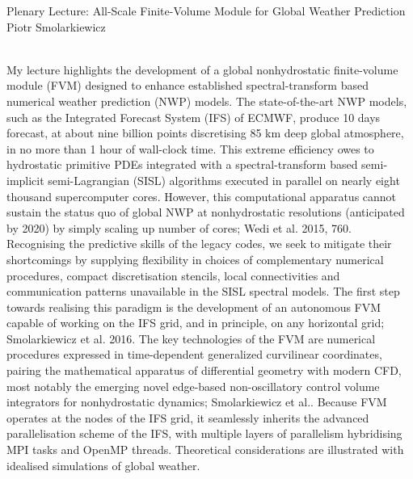     {  
			{Plenary Lecture: All-Scale Finite-Volume Module for Global Weather Prediction} \\
    \normalfont\small Piotr Smolarkiewicz }
    
    {  \\    
    } 
      {  } 
	\vspace{1cm} 
	My lecture highlights the development of a global nonhydrostatic finite-volume module (FVM) designed to enhance established spectral-transform based numerical weather prediction (NWP) models. The state-of-the-art NWP models, such as the Integrated Forecast System (IFS) of ECMWF, produce 10 days forecast, at about nine billion points discretising 85 km deep global atmosphere, in no more than 1 hour of wall-clock time. This extreme efficiency owes to hydrostatic primitive PDEs integrated with a spectral-transform based semi-implicit semi-Lagrangian (SISL) algorithms executed in parallel on nearly eight thousand supercomputer cores. However, this computational apparatus cannot sustain the status quo of global NWP at nonhydrostatic resolutions (anticipated by 2020) by simply scaling up number of cores; Wedi et al. 2015, 760. Recognising the predictive skills of the legacy codes, we seek to mitigate their shortcomings by supplying flexibility in choices of complementary numerical procedures, compact discretisation stencils, local connectivities and communication patterns unavailable in the SISL spectral models. The first step towards realising this paradigm is the development of an autonomous FVM capable of working on the IFS grid, and in principle, on any horizontal grid; Smolarkiewicz et al. 2016. The key technologies of the FVM are numerical procedures expressed in time-dependent generalized curvilinear coordinates, pairing the mathematical apparatus of differential geometry with modern CFD, most notably the emerging novel edge-based non-oscillatory control volume integrators for nonhydrostatic dynamics; Smolarkiewicz et al.. Because FVM operates at the nodes of the IFS grid, it seamlessly inherits the advanced parallelisation scheme of the IFS, with multiple layers of parallelism hybridising MPI tasks and OpenMP threads. Theoretical considerations are illustrated with idealised simulations of global weather.
	
         
    \vspace{.5cm}
    \newpage
    
